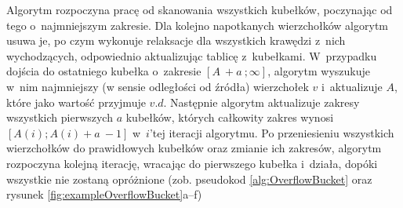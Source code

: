 Algorytm rozpoczyna pracę od skanowania wszystkich kubełków, poczynając od tego o~najmniejszym zakresie. Dla kolejno napotkanych wierzchołków algorytm usuwa je, po czym wykonuje relaksacje dla wszystkich krawędzi z~nich wychodzących, odpowiednio aktualizując tablicę z~kubełkami. W~przypadku dojścia do ostatniego kubełka o~zakresie $ \left [ A~+ a~; \infty \right] $, algorytm wyszukuje w~nim najmniejszy (w sensie odległości od źródła) wierzchołek $v$ i~aktualizuje $A$, które jako wartość przyjmuje $v.d$. Następnie algorytm aktualizuje zakresy wszystkich pierwszych $a$ kubełków, których całkowity zakres wynosi $ \left [ A \left( i \right) ; A \left( i \right) + a~- 1 \right] $ w~$i$'tej iteracji algorytmu. Po przeniesieniu wszystkich wierzchołków do prawidłowych kubełków oraz zmianie ich zakresów, algorytm rozpoczyna kolejną iterację, wracając do pierwszego kubełka i~działa, dopóki wszystkie nie zostaną opróżnione (zob. pseudokod \ref{alg:OverflowBucket} oraz rysunek \ref{fig:exampleOverflowBucket}a--f)

